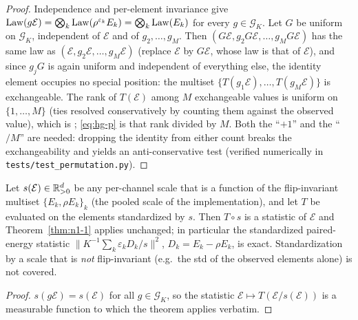 \begin{proof}
Independence and per-element invariance give $\operatorname{Law}(g\mathcal{E}) =
\bigotimes_k \operatorname{Law}(\rho^{\varepsilon_k}E_k) = \bigotimes_k \operatorname{Law}(E_k)$ for
every $g \in \mathcal{G}_K$. Let $G$ be uniform on $\mathcal{G}_K$,
independent of $\mathcal{E}$ and of $g_2,\dots,g_M$. Then $(G\mathcal{E},
g_2 G\mathcal{E}, \dots, g_M G\mathcal{E})$ has the same law as
$(\mathcal{E}, g_2\mathcal{E}, \dots, g_M\mathcal{E})$ (replace
$\mathcal{E}$ by $G\mathcal{E}$, whose law is that of $\mathcal{E}$), and
since $g_j G$ is again uniform and independent of everything else, the
identity element occupies no special position: the multiset $\{T(g_1
\mathcal{E}), \dots, T(g_M\mathcal{E})\}$ is exchangeable. The rank of
$T(\mathcal{E})$ among $M$ exchangeable values is uniform on $\{1,\dots,M\}$
(ties resolved conservatively by counting them against the observed value),
which is \cite[Theorem~2]{hemerik2018exact}; \eqref{eq:hg-p} is that rank
divided by $M$. Both the ``$+1$'' and the ``$/M$'' are needed: dropping the
identity from either count breaks the exchangeability and yields an
anti-conservative test (verified numerically in \texttt{tests/test\_permutation.py}).
\end{proof}

\begin{corollary}
\label{cor:studentize}
Let $s(\mathcal{E}) \in \mathbb{R}^{d}_{>0}$ be any per-channel scale that is a
function of the flip-invariant multiset $\{E_k, \rho E_k\}_k$ (the pooled
scale of the implementation), and let $T$ be evaluated on the elements
standardized by $s$. Then $T \circ s$ is a statistic of $\mathcal{E}$ and
Theorem~\ref{thm:n1-1} applies unchanged; in particular the standardized
paired-energy statistic $\|K^{-1}\sum_k \varepsilon_k D_k / s\|^2$, $D_k =
E_k - \rho E_k$, is exact. Standardization by a scale that is \emph{not}
flip-invariant (e.g.\ the std of the observed elements alone) is not
covered.
\end{corollary}

\begin{proof}
$s(g\mathcal{E}) = s(\mathcal{E})$ for all $g \in \mathcal{G}_K$, so the
statistic $\mathcal{E} \mapsto T(\mathcal{E}/s(\mathcal{E}))$ is a
measurable function to which the theorem applies verbatim.
\end{proof}

